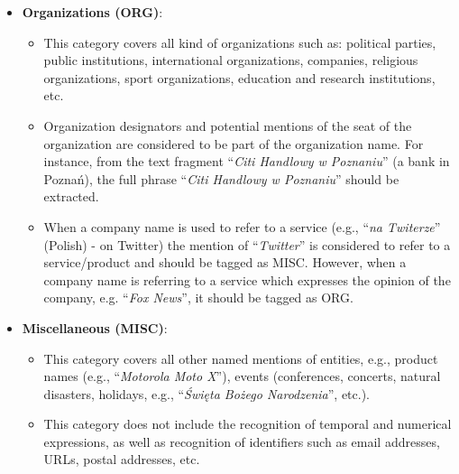 \documentclass[11pt]{article}
\begin{document}
\begin{itemize}
\begin{itemize}
  \end{itemize}

\item \textbf{Organizations (ORG)}:

  \begin{itemize}

  \item This category covers all kind of organizations such as: political
    parties, public institutions, international organizations, companies,
    religious organizations, sport organizations, education and research
    institutions, etc.

  \item Organization designators and potential mentions of the seat of
    the organization are considered to be part of the organization
    name. For instance, from the text fragment ``\textit{Citi Handlowy w
      Poznaniu}'' (a bank in Poznań), the full phrase ``\textit{Citi
      Handlowy w Poznaniu}'' should be extracted.
			
  \item When a company name is used to refer to a service (e.g., ``\textit{na
Twiterze}'' (Polish) - on Twitter) the mention of ``\textit{Twitter}'' is considered to 
refer to a service/product and should be tagged as MISC. However, when a company name 
is referring to a service which expresses the opinion of the company, e.g. ``\textit{Fox News}'', 
it should be tagged as ORG.			

  \end{itemize}

\item \textbf{Miscellaneous (MISC)}:

  \begin{itemize}

  \item This category covers all other named mentions of entities, e.g.,
    product names (e.g., ``\textit{Motorola Moto X}''), events
    (conferences, concerts, natural disasters, holidays, e.g.,
    ``\textit{Święta Bożego Narodzenia}'', etc.).

  \item This category does not include the recognition of temporal and
    numerical expressions, as well as recognition of identifiers such as
    email addresses, URLs, postal addresses, etc.

  \end{itemize}

\end{itemize}
\end{document}

